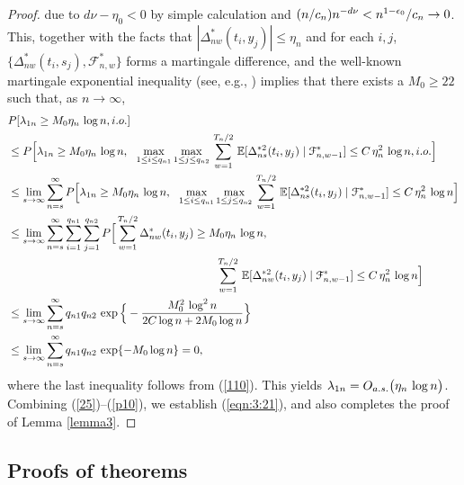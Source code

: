 \begin{proof}
\eestar
due to $d\nu-\eta_0 < 0$ by simple calculation and $(n / c_n) n^{-d\nu} < n^{1 - \epsilon_0} / c_n \to 0$.
This, together with the facts that  $|\Delta_{nw}^{*}(t_i, y_j)|\le \eta_n$ and for each $i, j$,
$\{\Delta_{nw}^{*}(t_i, s_j), {\mathcal F}_{n, w}^*\}$ forms a martingale difference, and
the well-known martingale exponential inequality
(see, e.g., \cite{delapena1999}) implies that there exists a $M_0\ge 22$ such that, as $n \to \infty$,
\begin{align}
& P[\lam_{1n} \ge  M_0 \eta_n\, \log n, i.o.] \no\\
&\le P\Big[\lam_{1n} \ge  M_0 \eta_n \, \log n,\ \ \max_{1 \le i \le q_{n1}} \max_{1 \le j \le q_{n2}}\, \sum_{w=1}^{T_n/2}\,\E [\Delta_{ns}^{*2}(t_i, y_j)\mid {\mathcal F}_{n, w-1}^*]\le C\, \eta_n^2\, \log n, i.o.  \Big] \no\\
&\le \lim_{s \to \infty} \sum_{n = s}^{\infty} P\Big[\lam_{1n} \ge  M_0 \eta_n \, \log n,\ \ \max_{1 \le i \le q_{n1}} \max_{1 \le j \le q_{n2}}\, \sum_{w=1}^{T_n/2}\,\E [\Delta_{ns}^{*2}(t_i, y_j)\mid {\mathcal F}_{n, w-1}^*]\le C\, \eta_n^2\, \log n \Big] \no\\
 &\le  \lim_{s \to \infty} \sum_{n = s}^{\infty}\sum_{i=1}^{q_{n1}} \sum_{j=1}^{q_{n2}}P\Big[\sum_{w=1}^{T_n/2} \Delta_{nw}^*(t_i, y_j)\ge M_0 \eta_n\, \log n, \no\\
 &\hskip 6.5cm \sum_{w=1}^{T_n/2}\,\E [\Delta_{nw}^{*2}(t_i, y_j)\mid {\mathcal F}_{n, w-1}^*]\le C\,\eta_n^2 \, \log n \Big]  \no\\
 &\le \lim_{s \to \infty} \sum_{n = s}^{\infty}q_{n1}q_{n2}\, \exp\Big\{-\frac {M_0^2 \,\log^2 n} {2C\log n+2M_0\log n} \Big \}  \no\\
 &\le \lim_{s \to \infty} \sum_{n = s}^{\infty}q_{n1}q_{n2}\, \exp \{-M_0\log n \}  = 0, \la {p10}
\end{align}
where the last inequality follows from (\ref {110}).
 This yields $\lambda_{1n}=O_{a.s.}\big( \eta_n \, \log n \big )$.
Combining (\ref {25})--(\ref {p10}), we establish (\ref {eqn:3:21}), and also completes the proof of Lemma \ref{lemma3}.
\end{proof}

\subsection{Proofs of theorems} 

